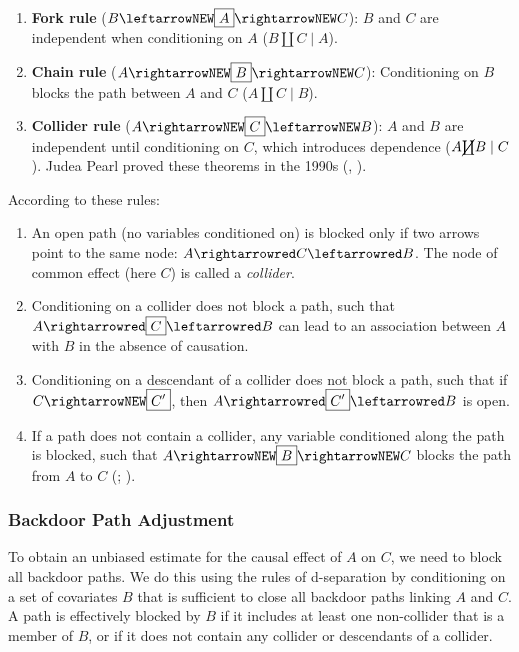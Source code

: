 \documentclass[
  single column]{article}
\providecommand{\tightlist}{%
  \setlength{\itemsep}{0pt}\setlength{\parskip}{0pt}}\usepackage{longtable,booktabs,array}
\begin{document}
\begin{enumerate}
\def\labelenumi{\arabic{enumi}.}
\tightlist
\item
  \textbf{Fork rule} (\(B \leftarrowNEW \boxed{A} \rightarrowNEW C\)):
  \(B\) and \(C\) are independent when conditioning on \(A\)
  (\(B \coprod C \mid A\)).
\item
  \textbf{Chain rule} (\(A \rightarrowNEW \boxed{B} \rightarrowNEW C\)):
  Conditioning on \(B\) blocks the path between \(A\) and \(C\)
  (\(A \coprod C \mid B\)).
\item
  \textbf{Collider rule}
  (\(A \rightarrowNEW \boxed{C} \leftarrowNEW B\)): \(A\) and \(B\) are
  independent until conditioning on \(C\), which introduces dependence
  (\(A \cancel{\coprod} B \mid C\)). Judea Pearl proved these theorems
  in the 1990s (,
  ).
\end{enumerate}

According to these rules:

\begin{enumerate}
\def\labelenumi{\arabic{enumi}.}
\tightlist
\item
  An open path (no variables conditioned on) is blocked only if two
  arrows point to the same node: \(A \rightarrowred C \leftarrowred B\).
  The node of common effect (here \(C\)) is called a \emph{collider}.
\item
  Conditioning on a collider does not block a path, such that
  \(A \rightarrowred \boxed{C} \leftarrowred B\) can lead to an
  association between \(A\) with \(B\) in the absence of causation.
\item
  Conditioning on a descendant of a collider does not block a path, such
  that if \(C \rightarrowNEW \boxed{C'}\), then
  \(A \rightarrowred \boxed{C'} \leftarrowred B\) is open.
\item
  If a path does not contain a collider, any variable conditioned along
  the path is blocked, such that
  \(A \rightarrowNEW \boxed{B} \rightarrowNEW C\) blocks the path from
  \(A\) to \(C\) (; ).
\end{enumerate}

\subsubsection{Backdoor Path Adjustment}\label{backdoor-path-adjustment}

To obtain an unbiased estimate for the causal effect of \(A\) on \(C\),
we need to block all backdoor paths. We do this using the rules of
d-separation by conditioning on a set of covariates \(B\) that is
sufficient to close all backdoor paths linking \(A\) and \(C\). A path
is effectively blocked by \(B\) if it includes at least one non-collider
that is a member of \(B\), or if it does not contain any collider or
descendants of a collider.
\end{document}
